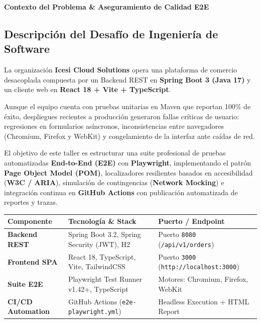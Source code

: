 \documentclass[10pt,letterpaper]{article}
\newcommand{\sectionBadge}[1]{%
  \refstepcounter{section}%
  \vspace{0.16cm}%
  \noindent%
  \colorbox{icesiBlue}{\color{white}\rule[-0.08cm]{0pt}{0.42cm}\hspace{0.16cm}\textbf{\normalsize \thesection}\hspace{0.16cm}}%
  \hspace{0.18cm}%
  {\fontsize{9.5}{12}\selectfont\textbf{\color{icesiDark}#1}}\\[-0.10cm]%
  \noindent{\color{icesiDark}\rule{\textwidth}{0.8pt}}\vspace{0.06cm}%
}
\begin{document}
\vspace{0.10cm}

\sectionBadge{Contexto del Problema \& Aseguramiento de Calidad E2E}

\subsection{Descripción del Desafío de Ingeniería de Software}
La organización \textbf{Icesi Cloud Solutions} opera una plataforma de comercio desacoplada compuesta por un Backend REST en \textbf{Spring Boot 3 (Java 17)} y un cliente web en \textbf{React 18 + Vite + TypeScript}.

Aunque el equipo cuenta con pruebas unitarias en Maven que reportan 100\% de éxito, despliegues recientes a producción generaron fallas críticas de usuario: regresiones en formularios asíncronos, inconsistencias entre navegadores (Chromium, Firefox y WebKit) y congelamiento de la interfaz ante caídas de red.

El objetivo de este taller es estructurar una suite profesional de pruebas automatizadas \textbf{End-to-End (E2E)} con \textbf{Playwright}, implementando el patrón \textbf{Page Object Model (POM)}, localizadores resilientes basados en accesibilidad (\textbf{W3C / ARIA}), simulación de contingencias (\textbf{Network Mocking}) e integración continua en \textbf{GitHub Actions} con publicación automatizada de reportes y trazas.

\vspace{0.08cm}
\noindent
\small
\begin{tabularx}{\textwidth}{|L{2.8cm}|X|L{3.5cm}|}
\hline
{}
\textbf{Componente} & \textbf{Tecnología \& Stack} & \textbf{Puerto / Endpoint} \\ \hline
\textbf{Backend REST} & Spring Boot 3.2, Spring Security (JWT), H2 & Puerto \texttt{8080} (\texttt{/api/v1/orders}) \\ \hline
\textbf{Frontend SPA} & React 18, TypeScript, Vite, TailwindCSS & Puerto \texttt{3000} (\texttt{http://localhost:3000}) \\ \hline
\textbf{Suite E2E} & Playwright Test Runner v1.42+, TypeScript & Motores: Chromium, Firefox, WebKit \\ \hline
\textbf{CI/CD Automation} & GitHub Actions (\texttt{e2e-playwright.yml}) & Headless Execution + HTML Report \\ \hline
\end{tabularx}
\end{document}

